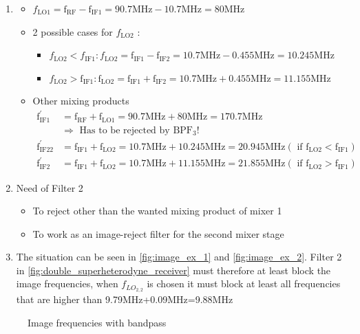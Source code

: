 \begin{enumerate}
    \item 
    \begin{itemize}
        \item $f_{\mathrm{LO} 1}=\mathrm{f}_{\mathrm{RF}}-\mathrm{f}_{\mathrm{IF} 1}=90.7 \mathrm{MHz}-10.7 \mathrm{MHz}=80 \mathrm{MHz}$
        \item 2 possible cases for $f_{\mathrm{LO2}}$ :
        \begin{itemize}
            \item $f_{\mathrm{LO2}}<f_{\mathrm{IF} 1}:  f_{\mathrm{LO2}}=\mathrm{f}_{\mathrm{IF} 1}-\mathrm{f}_{\mathrm{IF} 2}=10.7 \mathrm{MHz}-0.455 \mathrm{MHz}=10.245 \mathrm{MHz}$
            \item $f_{\mathrm{LO2}}>\mathrm{f}_{\mathrm{IF} 1}:  \mathrm{f}_{\mathrm{LO2}}=\mathrm{f}_{\mathrm{IF} 1}+\mathrm{f}_{\mathrm{IF} 2}=10.7 \mathrm{MHz}+0.455 \mathrm{MHz}=11.155 \mathrm{MHz}$
        \end{itemize}
        \item Other mixing products
        $$\begin{aligned} \mathrm{f}_{\mathrm{IF} 1}^{\prime} & =\mathrm{f}_{\mathrm{RF}}+\mathrm{f}_{\mathrm{LO} 1}=90.7 \mathrm{MHz}+80 \mathrm{MHz}=170.7 \mathrm{MHz} \\ & \Rightarrow \text { Has to be rejected by } \mathrm{BPF}_{3} ! \\ \mathrm{f}_{\mathrm{IF2} 2}^{\prime} & =\mathrm{f}_{\mathrm{IF} 1}+\mathrm{f}_{\mathrm{LO2}}=10.7 \mathrm{MHz}+10.245 \mathrm{MHz}=20.945 \mathrm{MHz}\left(\text { if } \mathrm{f}_{\mathrm{LO2}}<\mathrm{f}_{\mathrm{IF} 1}\right) \\ \mathrm{f}_{\mathrm{IF} 2}^{\prime} & =\mathrm{f}_{\mathrm{IF} 1}+\mathrm{f}_{\mathrm{LO2}}=10.7 \mathrm{MHz}+11.155 \mathrm{MHz}=21.855 \mathrm{MHz}\left(\text { if } \mathrm{f}_{\mathrm{LO2}}>\mathrm{f}_{\mathrm{IF} 1}\right)\end{aligned}$$
    \end{itemize}
    \item Need of Filter 2
    \begin{itemize}
        \item To reject other than the wanted mixing product of mixer 1
        \item To work as an image-reject filter for the second mixer stage
    \end{itemize}
    \item The situation can be seen in \autoref{fig:image_ex_1} and \autoref{fig:image_ex_2}. Filter 2 in \autoref{fig:double_superheterodyne_receiver} must therefore at least block the image frequencies, when $f_{LO_{2,2}}$ is chosen it must block at least all frequencies that are higher than 9.79MHz+0.09MHz=9.88MHz
    
\end{enumerate}
\begin{figure}[ht]
  \centering
  \caption{Image frequencies with bandpass}
  \label{fig:image_ex_1}
\end{figure}

